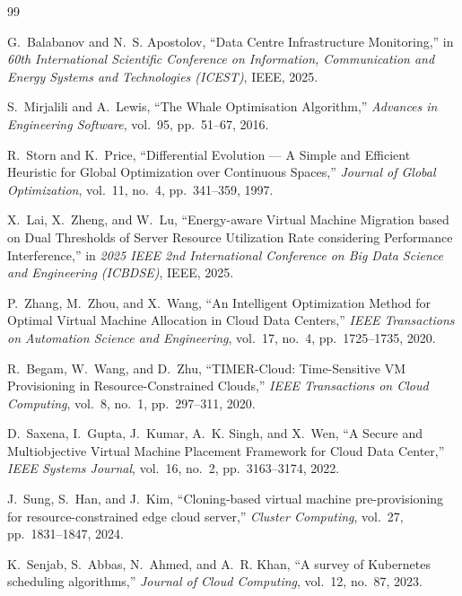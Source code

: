 \documentclass[12pt,a4paper]{report}
\begin{document}
\begin{thebibliography}{99}

G.~Balabanov and N.~S. Apostolov, ``Data Centre Infrastructure Monitoring,'' in
\textit{60th International Scientific Conference on Information, Communication and
Energy Systems and Technologies (ICEST)}, IEEE, 2025.

S.~Mirjalili and A.~Lewis, ``The Whale Optimisation Algorithm,'' \textit{Advances
in Engineering Software}, vol.~95, pp.~51--67, 2016.

R.~Storn and K.~Price, ``Differential Evolution --- A Simple and Efficient Heuristic
for Global Optimization over Continuous Spaces,'' \textit{Journal of Global
Optimization}, vol.~11, no.~4, pp.~341--359, 1997.

X.~Lai, X.~Zheng, and W.~Lu, ``Energy-aware Virtual Machine Migration based on Dual
Thresholds of Server Resource Utilization Rate considering Performance Interference,''
in \textit{2025 IEEE 2nd International Conference on Big Data Science and Engineering
(ICBDSE)}, IEEE, 2025.

P.~Zhang, M.~Zhou, and X.~Wang, ``An Intelligent Optimization Method for Optimal
Virtual Machine Allocation in Cloud Data Centers,'' \textit{IEEE Transactions on
Automation Science and Engineering}, vol.~17, no.~4, pp.~1725--1735, 2020.

R.~Begam, W.~Wang, and D.~Zhu, ``TIMER-Cloud: Time-Sensitive VM Provisioning in
Resource-Constrained Clouds,'' \textit{IEEE Transactions on Cloud Computing}, vol.~8,
no.~1, pp.~297--311, 2020.

D.~Saxena, I.~Gupta, J.~Kumar, A.~K. Singh, and X.~Wen, ``A Secure and
Multiobjective Virtual Machine Placement Framework for Cloud Data Center,'' \textit{IEEE
Systems Journal}, vol.~16, no.~2, pp.~3163--3174, 2022.

J.~Sung, S.~Han, and J.~Kim, ``Cloning-based virtual machine pre-provisioning for
resource-constrained edge cloud server,'' \textit{Cluster Computing}, vol.~27,
pp.~1831--1847, 2024.

K.~Senjab, S.~Abbas, N.~Ahmed, and A.~R. Khan, ``A survey of Kubernetes scheduling
algorithms,'' \textit{Journal of Cloud Computing}, vol.~12, no.~87, 2023.


\end{thebibliography}
\end{document}
